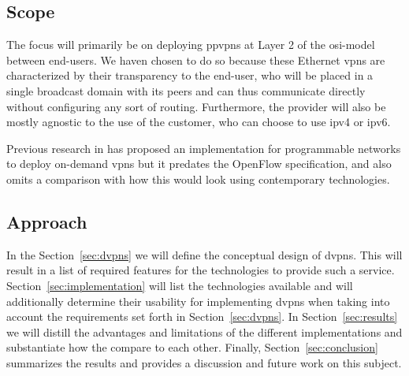 
	\subsection{Scope} %
	\label{sub:scope}
	The focus will primarily be on deploying \acp{ppvpn} at Layer 2 of the \acs{osi}-model between end-users. We haven chosen to do so because these Ethernet \acp{vpn} are characterized by their transparency to the end-user, who will be placed in a single broadcast domain with its peers and can thus communicate directly without configuring any sort of routing. Furthermore, the provider will also be mostly agnostic to the use of the customer, who can choose to use \acs{ip}v4 or \acs{ip}v6.
	
	Previous research in \cite{net-prog-vpn} has proposed an implementation for programmable networks to deploy on-demand \acp{vpn} but it predates the OpenFlow specification, and also omits a comparison with how this would look using contemporary technologies. 


	\subsection{Approach} %
	\label{sub:approach}
	In the Section~\ref{sec:dvpns} we will define the conceptual design of \acp{dvpn}. This will result in a list of required features for the technologies to provide such a service. Section~\ref{sec:implementation} will list the technologies available and will additionally determine their usability for implementing \acp{dvpn} when taking into account the requirements set forth in Section~\ref{sec:dvpns}. In Section~\ref{sec:results} we will distill the advantages and limitations of the different implementations and substantiate how the compare to each other. Finally, Section~\ref{sec:conclusion} summarizes the results and provides a discussion and future work on this subject.



